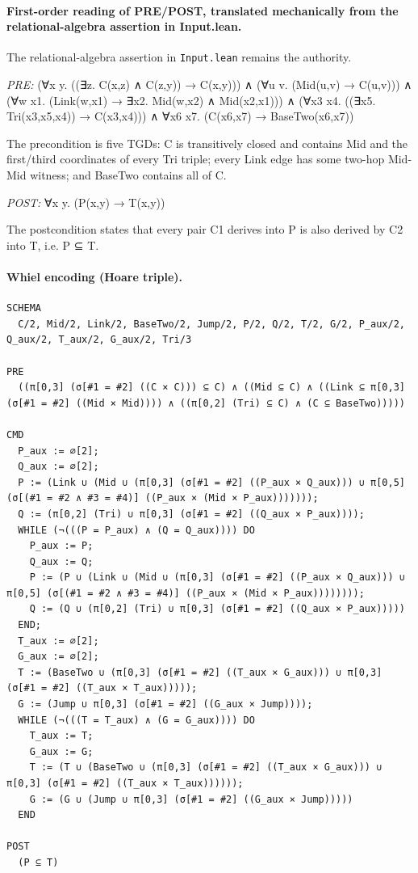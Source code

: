 \documentclass[10pt]{article}
\begin{document}
\paragraph{First-order reading of PRE/POST, translated mechanically from the relational-algebra assertion in Input.lean.} The relational-algebra assertion in \texttt{Input.lean} remains the authority.

\textit{PRE:} (∀x y. ((∃z. C(x,z) ∧ C(z,y)) → C(x,y))) ∧ (∀u v. (Mid(u,v) → C(u,v))) ∧ (∀w x1. (Link(w,x1) → ∃x2. Mid(w,x2) ∧ Mid(x2,x1))) ∧ (∀x3 x4. ((∃x5. Tri(x3,x5,x4)) → C(x3,x4))) ∧ ∀x6 x7. (C(x6,x7) → BaseTwo(x6,x7))\par The precondition is five TGDs: C is transitively closed and contains Mid and the first/third coordinates of every Tri triple; every Link edge has some two-hop Mid-Mid witness; and BaseTwo contains all of C.

\textit{POST:} ∀x y. (P(x,y) → T(x,y))\par The postcondition states that every pair C1 derives into P is also derived by C2 into T, i.e. P ⊆ T.

\paragraph{Whiel encoding (Hoare triple).}

\begin{Verbatim}[fontsize=\scriptsize,breaklines=true,breakanywhere=true,frame=single,framesep=1.5mm]
SCHEMA
  C/2, Mid/2, Link/2, BaseTwo/2, Jump/2, P/2, Q/2, T/2, G/2, P_aux/2, Q_aux/2, T_aux/2, G_aux/2, Tri/3

PRE
  ((π[0,3] (σ[#1 = #2] ((C × C))) ⊆ C) ∧ ((Mid ⊆ C) ∧ ((Link ⊆ π[0,3] (σ[#1 = #2] ((Mid × Mid)))) ∧ ((π[0,2] (Tri) ⊆ C) ∧ (C ⊆ BaseTwo)))))

CMD
  P_aux := ∅[2];
  Q_aux := ∅[2];
  P := (Link ∪ (Mid ∪ (π[0,3] (σ[#1 = #2] ((P_aux × Q_aux))) ∪ π[0,5] (σ[(#1 = #2 ∧ #3 = #4)] ((P_aux × (Mid × P_aux)))))));
  Q := (π[0,2] (Tri) ∪ π[0,3] (σ[#1 = #2] ((Q_aux × P_aux))));
  WHILE (¬(((P = P_aux) ∧ (Q = Q_aux)))) DO
    P_aux := P;
    Q_aux := Q;
    P := (P ∪ (Link ∪ (Mid ∪ (π[0,3] (σ[#1 = #2] ((P_aux × Q_aux))) ∪ π[0,5] (σ[(#1 = #2 ∧ #3 = #4)] ((P_aux × (Mid × P_aux))))))));
    Q := (Q ∪ (π[0,2] (Tri) ∪ π[0,3] (σ[#1 = #2] ((Q_aux × P_aux)))))
  END;
  T_aux := ∅[2];
  G_aux := ∅[2];
  T := (BaseTwo ∪ (π[0,3] (σ[#1 = #2] ((T_aux × G_aux))) ∪ π[0,3] (σ[#1 = #2] ((T_aux × T_aux)))));
  G := (Jump ∪ π[0,3] (σ[#1 = #2] ((G_aux × Jump))));
  WHILE (¬(((T = T_aux) ∧ (G = G_aux)))) DO
    T_aux := T;
    G_aux := G;
    T := (T ∪ (BaseTwo ∪ (π[0,3] (σ[#1 = #2] ((T_aux × G_aux))) ∪ π[0,3] (σ[#1 = #2] ((T_aux × T_aux))))));
    G := (G ∪ (Jump ∪ π[0,3] (σ[#1 = #2] ((G_aux × Jump)))))
  END

POST
  (P ⊆ T)
\end{Verbatim}
\end{document}
